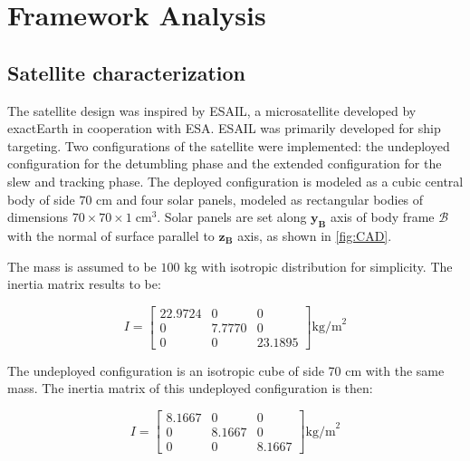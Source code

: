 \section{Framework Analysis}
\label{sec:framework}


\subsection{Satellite characterization}
\label{subsec:sat_characterization}

The satellite design was inspired by ESAIL, a microsatellite developed by exactEarth in cooperation with ESA. ESAIL was primarily developed for ship targeting.\cite{esail_site} Two configurations of the satellite were implemented: the undeployed configuration for the detumbling phase and the extended configuration for the slew and tracking phase. The deployed configuration is modeled as a cubic central body of side $70$ cm and four solar panels, modeled as rectangular bodies of dimensions $70 \times 70 \times 1 \; \text{cm}^3$. Solar panels are set along $\boldsymbol{y_B}$ axis of body frame $\mathcal{B}$ with the normal of surface parallel to $\boldsymbol{z_B}$ axis, as shown in \autoref{fig:CAD}.


The mass is assumed to be $100$ kg with isotropic distribution for simplicity. The inertia matrix results to be:

\begin{equation} \label{eq:dep_matrix}
    I =
    \begin{bmatrix}
        22.9724 & 0 & 0 \\
        0 & 7.7770 & 0 \\
        0 & 0 & 23.1895
    \end{bmatrix} \text{kg/m}^2
\end{equation}

The undeployed configuration is an isotropic cube of side 70 cm with the same mass. The inertia matrix of this undeployed configuration is then:

\begin{equation} \label{eq:undep_matrix}
    I =
    \begin{bmatrix}
        8.1667 & 0 & 0 \\
        0 & 8.1667 & 0 \\
        0 & 0 & 8.1667
    \end{bmatrix} \text{kg/m}^2
\end{equation}


